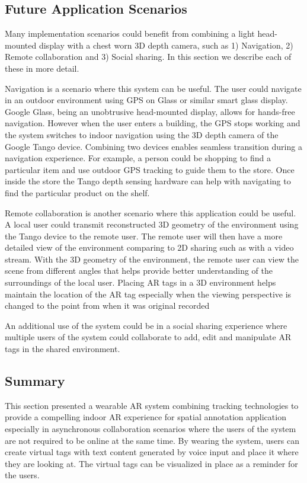 \subsection{Future Application Scenarios}

Many implementation scenarios could benefit from combining a light head-mounted display with a chest worn 3D depth camera,  such as 1) Navigation, 2) Remote collaboration and 3) Social sharing. In this section we describe each of these in more detail.

Navigation is a scenario where this system can be useful. The user could navigate in an outdoor environment using GPS on Glass or similar smart glass display. Google Glass, being an unobtrusive head-mounted display, allows for hands-free navigation. However when the user enters a building, the GPS stops working and the system switches to indoor navigation using the 3D depth camera of the Google Tango device. Combining two devices enables seamless transition during a navigation experience. For example, a person could be shopping to find a particular item and use outdoor GPS tracking to guide them to the store. Once inside the store the Tango depth sensing hardware can help with navigating to find the particular product on the shelf.

Remote collaboration is another scenario where this application could be useful. A local user could transmit reconstructed 3D geometry of the environment using the Tango device to the remote user. The remote user will then have a more detailed view of the environment comparing to 2D sharing such as with a video stream. With the 3D geometry of the environment, the remote user can view the scene from different angles that helps provide better understanding of the surroundings of the local user. Placing AR tags in a 3D environment helps maintain the location of the AR tag especially when the viewing perspective is changed to the point from when it was original recorded

An additional use of the system could be in a social sharing experience where multiple users of the system could collaborate to add, edit and manipulate AR tags in the shared environment. 

\subsection{Summary}

This section presented a wearable AR system combining tracking technologies to provide a compelling indoor AR experience for spatial annotation application especially in asynchronous collaboration scenarios where the users of the system are not required to be online at the same time. By wearing the system, users can create virtual tags with text content generated by voice input and place it where they are looking at. The virtual tags can be visualized in place as a reminder for the users.  

